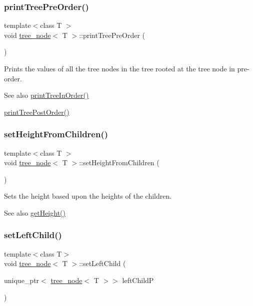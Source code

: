 \subsubsection{\texorpdfstring{print\+Tree\+Pre\+Order()}{printTreePreOrder()}}
{\footnotesize\ttfamily template$<$class T $>$ \\
void \hyperlink{classtree__node}{tree\+\_\+node}$<$ T $>$\+::print\+Tree\+Pre\+Order (\begin{DoxyParamCaption}{ }\end{DoxyParamCaption})}

Prints the values of all the tree nodes in the tree rooted at the tree node in pre-\/order. \begin{DoxySeeAlso}{See also}
\hyperlink{classtree__node_ae87818a195621d4defc1cde67e7219ee}{print\+Tree\+In\+Order()} 

\hyperlink{classtree__node_a4bfdd2b618c15252fcfbeab46ca05861}{print\+Tree\+Post\+Order()} 
\end{DoxySeeAlso}
\mbox{\label{classtree__node_ab83ce531535bd54bdee8fd3ee9e4c128}} 
\subsubsection{\texorpdfstring{set\+Height\+From\+Children()}{setHeightFromChildren()}}
{\footnotesize\ttfamily template$<$class T $>$ \\
void \hyperlink{classtree__node}{tree\+\_\+node}$<$ T $>$\+::set\+Height\+From\+Children (\begin{DoxyParamCaption}{ }\end{DoxyParamCaption})}

Sets the height based upon the heights of the children. \begin{DoxySeeAlso}{See also}
\hyperlink{classtree__node_a57c8b2000ad0a13b67532b81ba73720b}{get\+Height()} 
\end{DoxySeeAlso}
\mbox{\label{classtree__node_a3db979969a0fe8505ba65c7afabb5463}} 
\subsubsection{\texorpdfstring{set\+Left\+Child()}{setLeftChild()}}
{\footnotesize\ttfamily template$<$class T$>$ \\
void \hyperlink{classtree__node}{tree\+\_\+node}$<$ T $>$\+::set\+Left\+Child (\begin{DoxyParamCaption}\item[{unique\+\_\+ptr$<$ \hyperlink{classtree__node}{tree\+\_\+node}$<$ T $>$$>$}]{left\+ChildP }\end{DoxyParamCaption})\hspace{0.3cm}{\ttfamily [inline]}}

